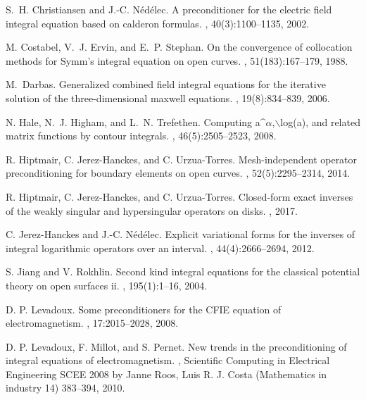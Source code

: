 \documentclass[a4paper]{subfiles}
\begin{document}
\begin{thebibliography}{10}
S.~H. Christiansen and J.-C. N{\'e}d{\'e}lec.
\newblock A preconditioner for the electric field integral equation based on
  calderon formulas.
, 40(3):1100--1135, 2002.

M. Costabel, V.~J. Ervin, and E.~P. Stephan.
\newblock On the convergence of collocation methods for Symm's integral
  equation on open curves.
, 51(183):167--179, 1988.

M.~Darbas.
\newblock Generalized combined field integral equations for the iterative
  solution of the three-dimensional maxwell equations.
, 19(8):834--839, 2006.

N. Hale, N.~J. Higham, and L.~N. Trefethen.
\newblock Computing a\^{}$\alpha$,$\backslash$log(a), and related matrix
  functions by contour integrals.
, 46(5):2505--2523, 2008.

R. Hiptmair, C. Jerez-Hanckes, and C. Urzua-Torres.
\newblock Mesh-independent operator preconditioning for boundary elements on
  open curves.
, 52(5):2295--2314, 2014.

R. Hiptmair, C. Jerez-Hanckes, and C. Urzua-Torres.
\newblock Closed-form exact inverses of the weakly singular and hypersingular
  operators on disks.
, 2017.

C. Jerez-Hanckes and J.-C. N{\'e}d{\'e}lec.
\newblock Explicit variational forms for the inverses of integral logarithmic
  operators over an interval.
, 44(4):2666--2694, 2012.

S. Jiang and V. Rokhlin.
\newblock Second kind integral equations for the classical potential theory on
  open surfaces ii.
, 195(1):1--16, 2004.

{D. P.} Levadoux.
\newblock Some preconditioners for the {CFIE} equation of electromagnetism.
, 17:2015--2028, 2008.

{D. P.} Levadoux, {F.} Millot, and {S.} Pernet.
\newblock New trends in the preconditioning of integral equations of electromagnetism.
, Scientific Computing in Electrical Engineering SCEE 2008 by Janne Roos, Luis R. J. Costa
(Mathematics in industry 14) 383--394, 2010.


\end{thebibliography}
\end{document}
